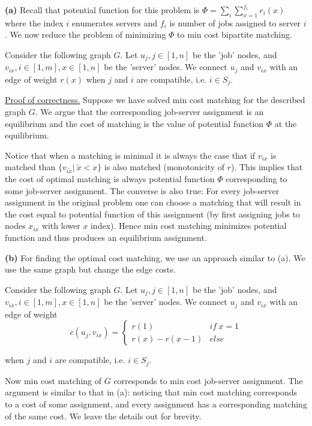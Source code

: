 \textbf{(a)} Recall that potential function for this problem is $\Phi = \sum_i \sum_{x=1}^{f_i}r_i(x)$ where the index $i$ enumerates servers and $f_i$ is number of jobs assigned to server $i$. We now reduce the problem of minimizing $\Phi$ to min cost bipartite matching.

Consider the following graph $G$. Let $u_j,j\in[1,n]$ be the 'job' nodes, and $v_{ix},i\in[1,m],x\in[1,n]$ be the 'server' nodes. We connect $u_j$ and $v_{ix}$ with an edge of weight $r(x)$ when $j$ and $i$ are compatible, i.e. $i\in S_j$. 

\uline{Proof of correctness.} Suppose we have solved min cost matching for the described graph $G$. We argue that the corresponding job-server assignment is an equilibrium and the cost of matching is the value of potential function $\Phi$ at the equilibrium.  

Notice that when a matching is minimal it is always the case that if $v_{ix}$ is matched than $\{v_{i\tilde x}|\ \tilde x<x\}$ is also matched (monotonicity of $r$). This implies that the cost of optimal matching is always potential function $\Phi$ corresponding to some job-server assignment. The converse is also true: For every job-server assignment in the original problem one can choose a matching that will result in the cost equal to potential function of this assignment (by first assigning jobs to nodes $x_{ix}$ with lower $x$ index). Hence min cost matching minimizes potential function and thus produces an equilibrium assignment.

\textbf{(b)} For finding the optimal cost matching, we use an approach similar to (a). We use the same graph but change the edge costs.

Consider the following graph $G$. Let $u_j,j\in[1,n]$ be the 'job' nodes, and $v_{ix},i\in[1,m],x\in[1,n]$ be the 'server' nodes. We connect $u_j$ and $v_{ix}$ with an edge of weight $$ c(u_j,v_{ix})=\begin{cases} r(1)\qquad &if\ x=1 \\ r(x)-r(x-1) &else \end{cases}$$ 


when $j$ and $i$ are compatible, i.e. $i\in S_j$. 

Now min cost matching of $G$ corresponds to min cost job-server assignment. The argument is similar to that in (a): noticing that min cost matching corresponds to a cost of some assignment, and every assignment has a corresponding matching of the same cost. We leave the details out for brevity.

